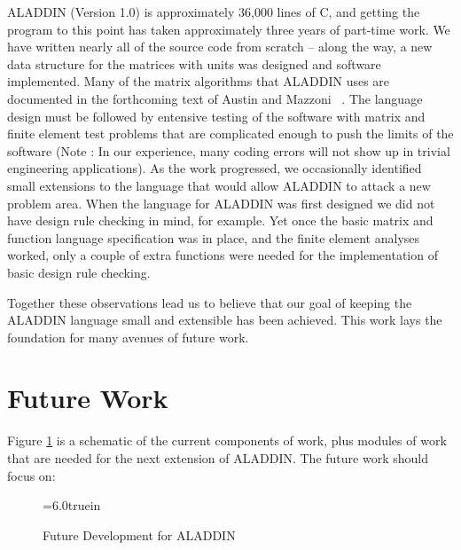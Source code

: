 \vspace{0.15 in}
\noindent\hspace{0.5 in}
ALADDIN (Version 1.0) is approximately 36,000 lines of C,
and getting the program to this point has taken
approximately three years of part-time work.
We have written nearly all of the source code from scratch -- along the way,
a new data structure for the matrices with units was designed and software implemented.
Many of the matrix algorithms that ALADDIN uses are documented
in the forthcoming text of Austin and Mazzoni ~\cite{austin95}.
The language design must be followed by entensive testing of the software
with matrix and finite element test problems that are complicated
enough to push the limits of the software (Note : In our experience,
many coding errors will not show up in trivial engineering applications).
As the work progressed, we occasionally identified small extensions to
the language that would allow ALADDIN to attack a new problem area.
When the language for ALADDIN was first designed
we did not have design rule checking in mind, for example.
Yet once the basic matrix and function language specification was in place, 
and the finite element analyses worked, only a couple of extra functions
were needed for the implementation of basic design rule checking.

\vspace{0.15 in}
\noindent\hspace{0.5 in}
Together these observations lead us to believe that
our goal of keeping the ALADDIN language small and extensible has been achieved.
This work lays the foundation for many avenues of future work.

\section{Future Work}

\vspace{0.15 in}
\noindent\hspace{0.5 in}
Figure \ref{fig: aladdin-future-development} is a schematic
of the current components of work, plus modules of work
that are needed for the next extension of ALADDIN.
The future work should focus on:

\begin{figure}[ht]
\epsfxsize=6.0truein
\centerline{}
\caption{Future Development for ALADDIN}
\label{fig: aladdin-future-development}
\end{figure}

